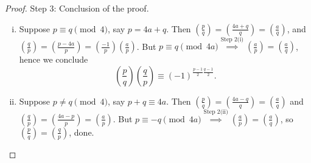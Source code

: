 \documentclass{article}
\theoremstyle{definition}
\begin{document}
\begin{proof}
    Step 3: Conclusion of the proof. 
    \begin{enumerate}[(i)]
        \item Suppose $p \equiv q \pmod{4}$, say $p = 4a +q$. Then $\left(\frac{p}{q} \right) = \left(\frac{4a+q}{q} \right) = \left(\frac{a}{q} \right)$, and $\left(\frac{q}{p} \right) = \left(\frac{p-4a}{p} \right) = \left(\frac{-1}{p} \right) \left(\frac{a}{p} \right) $. But $p \equiv q \pmod{4a}\stackrel{\text{Step 2(i)}}{\implies} \left(\frac{a}{p} \right) =\left(\frac{a}{q} \right)$, hence we conclude 
        \[
            \left(\frac{p}{q}\right)\left(\frac{q}{p}\right) \equiv (-1)^{\frac{p-1}{2}\frac{q-1}{2}}.
        \]
        \item Suppose $p \neq q \pmod{4}$, say $p+q \equiv 4a$. Then $\left(\frac{p}{q} \right) = \left(\frac{4a-q}{q} \right) = \left(\frac{a}{q} \right)$ and $\left(\frac{q}{p}  \right) = \left(\frac{4a-p}{p} \right) = \left(\frac{a}{p} \right)$. But $p \equiv -q \pmod{4a} \stackrel{\text{Step 2(ii)}}{\implies} \left(\frac{a}{p} \right) = \left(\frac{a}{q} \right)$, so $\left(\frac{p}{q} \right) =\left(\frac{q}{p} \right)$, done.
    \end{enumerate}
    
\end{proof}
\end{document}
